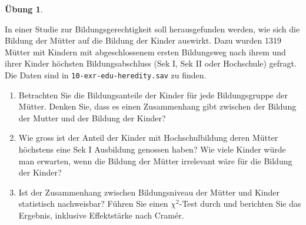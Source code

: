 \documentclass[
]{book}
\providecommand{\tightlist}{%
  \setlength{\itemsep}{0pt}\setlength{\parskip}{0pt}}
\theoremstyle{definition}
\theoremstyle{definition}
\theoremstyle{definition}
\newtheorem{exercise}{Übung}[chapter]
\theoremstyle{definition}
\theoremstyle{remark}
\begin{document}
\begin{exercise}
\protect\hypertarget{exr:edu-heredity}{}\label{exr:edu-heredity}\leavevmode

In einer Studie zur Bildungsgerechtigkeit soll herausgefunden werden, wie sich die Bildung der Mütter auf die Bildung der Kinder auswirkt. Dazu wurden 1319 Mütter mit Kindern mit abgeschlossenem ersten Bildungsweg nach ihrem und ihrer Kinder höchsten Bildungsabschluss (Sek I, Sek II oder Hochschule) gefragt. Die Daten sind in \texttt{10-exr-edu-heredity.sav} zu finden.

\begin{enumerate}
\def\labelenumi{\alph{enumi})}
\tightlist
\item
  Betrachten Sie die Bildungsanteile der Kinder für jede Bildungsgruppe der Mütter. Denken Sie, dass es einen Zusammenhang gibt zwischen der Bildung der Mutter und der Bildung der Kinder?
\item
  Wie gross ist der Anteil der Kinder mit Hochschulbildung deren Mütter höchstens eine Sek I Ausbildung genossen haben? Wie viele Kinder würde man erwarten, wenn die Bildung der Mütter irrelevant wäre für die Bildung der Kinder?
\item
  Ist der Zusammenhang zwischen Bildungsniveau der Mütter und Kinder statistisch nachweisbar? Führen Sie einen \(\chi^2\)-Test durch und berichten Sie das Ergebnis, inklusive Effektstärke nach Cramér.
\end{enumerate}

\end{exercise}
\end{document}
